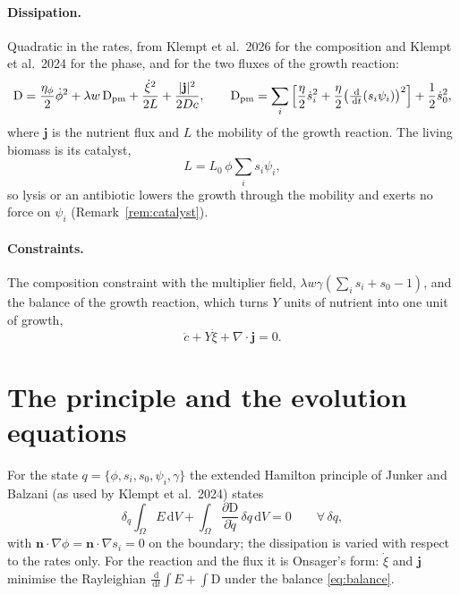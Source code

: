 \documentclass[11pt,a4paper]{article}
\newcommand{\dd}{\,\mathrm{d}}
\newcommand{\D}{\mathrm{D}}
\newcommand{\living}{\textstyle\sum_i s_i\psi_i}
\begin{document}
\paragraph{Dissipation.} Quadratic in the rates, from Klempt et al.\ 2026 for the composition
and Klempt et al.\ 2024 for the phase, and for the two fluxes of the growth reaction:
\begin{equation}
\D=\frac{\eta_\phi}{2}\dot\phi^2+\lambda w\,\D_{\rm pm}+\frac{\dot\xi^2}{2L}+\frac{|\mathbf j|^2}{2Dc},\qquad
\D_{\rm pm}=\sum_i\Big[\frac{\eta}{2}\dot s_i^2+\frac{\eta}{2}\big(\tfrac{\dd}{\dd t}(s_i\psi_i)\big)^2\Big]+\frac12\dot s_0^2 ,
\label{eq:D}
\end{equation}
where $\mathbf j$ is the nutrient flux and $L$ the mobility of the growth reaction. The living
biomass is its catalyst,
\begin{equation}
L=L_0\,\phi\living ,
\label{eq:L}
\end{equation}
so lysis or an antibiotic lowers the growth through the mobility and exerts no force on
$\psi_i$ (Remark~\ref{rem:catalyst}).

\paragraph{Constraints.} The composition constraint with the multiplier field,
$\lambda w\gamma(\sum_is_i+s_0-1)$, and the balance of the growth reaction, which turns $Y$
units of nutrient into one unit of growth,
\begin{equation}
\dot c+Y\dot\xi+\nabla\!\cdot\mathbf j=0 .
\label{eq:balance}
\end{equation}

\section{The principle and the evolution equations}

For the state $q=\{\phi,s_i,s_0,\psi_i,\gamma\}$ the extended Hamilton principle of Junker
and Balzani (as used by Klempt et al.\ 2024) states
\begin{equation}
\delta_q\int_\Omega E\dd V+\int_\Omega\frac{\partial\D}{\partial\dot q}\,\delta q\dd V=0
\qquad\forall\,\delta q,
\label{eq:principle}
\end{equation}
with $\mathbf n\cdot\nabla\phi=\mathbf n\cdot\nabla s_i=0$ on the boundary; the dissipation is
varied with respect to the rates only. For the reaction and the flux it is Onsager's form:
$\dot\xi$ and $\mathbf j$ minimise the Rayleighian $\frac{\dd}{\dd t}\int E+\int\D$ under the
balance \eqref{eq:balance}.
\end{document}

